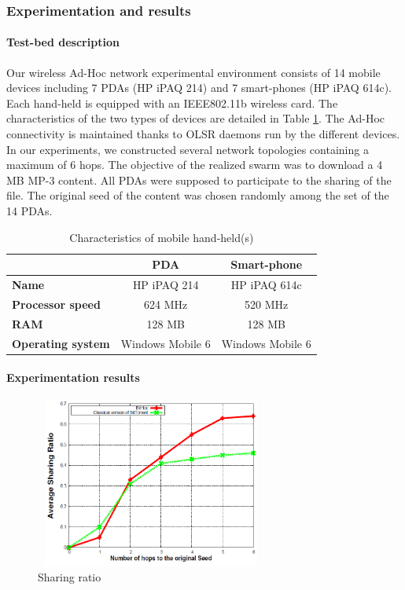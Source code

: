 \subsubsection{Experimentation and results}
\label{sectest}

\paragraph{Test-bed description}

Our wireless Ad-Hoc network experimental environment consists of 14 mobile devices including 7 PDAs (HP iPAQ 214) and 7 smart-phones (HP iPAQ 614c). Each hand-held is equipped with an IEEE802.11b wireless card. The characteristics of the two types of devices are detailed in Table \ref{tabcarac}. The Ad-Hoc connectivity is maintained thanks to OLSR daemons run by the different devices. In our experiments, we constructed several network topologies containing a maximum of 6 hops. The objective of the realized swarm was to download a 4 MB MP-3 content. All PDAs were supposed to participate to the sharing of the file. The original seed of the content was chosen randomly among the set of the 14 PDAs.

\begin{table}[!h]
\center
\label{tabcarac}
\caption{Characteristics of mobile hand-held(s)}
\begin{tabular}{|l|c|c|}
  \hline
   & \textbf{PDA} & \textbf{Smart-phone} \\
  \hline
  \textbf{Name} & HP iPAQ 214 & HP iPAQ 614c\\
\hline
  \textbf{Processor speed} & 624 MHz & 520 MHz \\
  \hline
\textbf{RAM} & 128 MB & 128 MB \\
  \hline
\textbf{Operating system} & Windows Mobile 6 & Windows Mobile 6 \\
  \hline
\end{tabular}
\end{table}

\paragraph{Experimentation results}

\begin{figure}[!h]
  \begin{center}
    \includegraphics[width=3in,height=2.2in]{Chapitre2/sharingratio.png}
  \end{center}
  \caption{Sharing ratio}
  \label{figsharing}
\end{figure}

